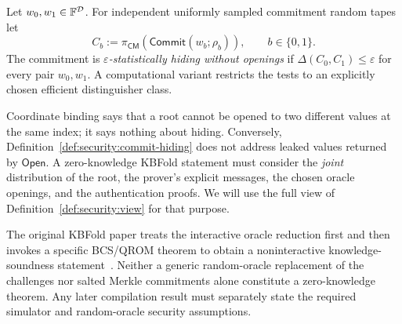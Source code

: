 \begin{definition}\label{def:security:commit-hiding}
Let $w_0,w_1\in\mathbb{F}^\mathcal D$. For independent uniformly sampled commitment random tapes let
\[
 C_b:=\pi_{\mathsf{CM}}(\mathsf{Commit}(w_b;\rho_b)),\qquad b\in\{0,1\}.
\]
The commitment is \emph{$\varepsilon$-statistically hiding without openings} if
$\Delta(C_0,C_1)\leq\varepsilon$ for every pair $w_0,w_1$.
A computational variant restricts the tests to an explicitly chosen efficient distinguisher class.
\end{definition}

\begin{remark}
Coordinate binding says that a root cannot be opened to two different values at the same index; it says nothing about hiding. Conversely, Definition~\ref{def:security:commit-hiding} does not address leaked values returned by $\mathsf{Open}$. A zero-knowledge KBFold statement must consider the \emph{joint} distribution of the root, the prover's explicit messages, the chosen oracle openings, and the authentication proofs. We will use the full view of Definition~\ref{def:security:view} for that purpose.
\end{remark}

\begin{remark}
The original KBFold paper treats the interactive oracle reduction first and then invokes a specific BCS/QROM theorem to obtain a noninteractive knowledge-soundness statement~\cite{MkhidaKBFold2026}. Neither a generic random-oracle replacement of the challenges nor salted Merkle commitments alone constitute a zero-knowledge theorem. Any later compilation result must separately state the required simulator and random-oracle security assumptions.
\end{remark}
